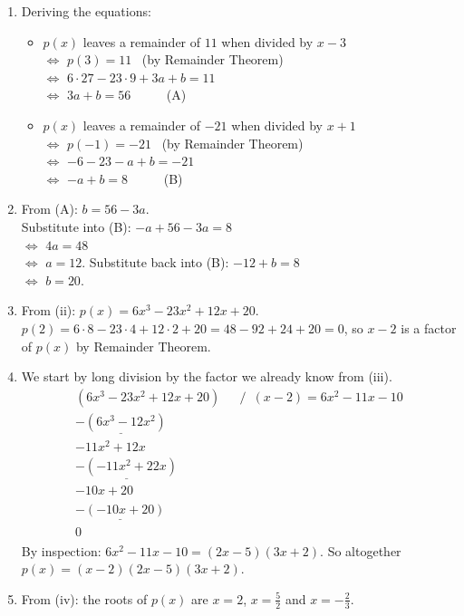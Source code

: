 \documentclass[
  english,
  12pt,
  oneside]{book}
\providecommand{\tightlist}{%
  \setlength{\itemsep}{0pt}\setlength{\parskip}{0pt}}
\theoremstyle{definition}
\theoremstyle{definition}
\theoremstyle{definition}
\theoremstyle{definition}
\theoremstyle{remark}
\begin{document}
\begin{enumerate}
\def\labelenumi{(\roman{enumi})}
\item
  Deriving the equations:

  \begin{itemize}
  \tightlist
  \item
    \(p(x)\) leaves a remainder of \(11\) when divided by \(x-3\)\\
    \(\iff\) \(p(3)=11\) \hfill~{(by Remainder Theorem)}\\
    \(\iff\) \(6\cdot 27-23\cdot 9+3a+b = 11\)\\
    \(\iff\) \(3a+b=56\) ~ ~ ~ (A)
  \item
    \(p(x)\) leaves a remainder of \(-21\) when divided by \(x+1\)\\
    \(\iff\) \(p(-1)=-21\) \hfill~{(by Remainder Theorem)}\\
    \(\iff\) \(-6-23-a+b=-21\)\\
    \(\iff\) \(-a+b=8\) ~ ~ ~ (B)
  \end{itemize}
\item
  From (A): \(b=56-3a\).\\
  Substitute into (B): \(-a+56-3a = 8\)\\
  \(\iff\) \(4a=48\)\\
  \(\iff\) \(a=12\).
  Substitute back into (B): \(-12+b=8\)\\
  \(\iff\) \(b=20\).
\item
  From (ii): \(p(x)=6x^3-23x^2+12x+20\).\\
  \(p(2)=6\cdot8 - 23\cdot 4+12\cdot2+20=48-92+24+20=0\), so \(x-2\) is a factor of \(p(x)\) by Remainder Theorem.
\item
  We start by long division by the factor we already know from (iii).
  \[\begin{array}{rl}
  (6x^3-23x^2+12x+20) & / \,\,\,(x-2) = 6x^2-11x-10\\
  \underline{-(6x^3-12x^2)}\phantom{+12x+20)}\\
  -11x^2+12x\phantom{+20m}\\
  \underline{-(-11x^2+22x)}\phantom{+20)}\\
  -10x+20\phantom{)}\\
  \underline{-(-10x+20)}\\
  0\phantom{)}
  \end{array}\]
  By inspection: \(6x^2-11x-10=(2x-5)(3x+2)\).
  So altogether \(p(x)=(x-2)(2x-5)(3x+2)\).
\item
  From (iv): the roots of \(p(x)\) are \(x=2\), \(x=\frac{5}{2}\) and \(x=-\frac{2}{3}\).
\end{enumerate}
\end{document}

